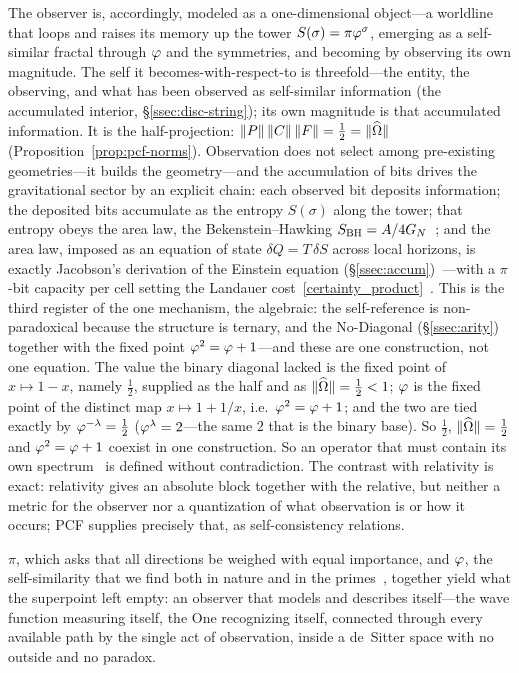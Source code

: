 The observer is, accordingly, modeled as a one-dimensional object---a worldline that loops and raises its memory up the tower $S(\sigma)=\pi\varphi^\sigma$, emerging as a self-similar fractal through $\varphi$ and the symmetries, and becoming by observing its own magnitude. The self it becomes-with-respect-to is threefold---the entity, the observing, and what has been observed as self-similar information (the accumulated interior, \S\ref{ssec:disc-string}); its own magnitude is that accumulated information. It is the half-projection: $\|P\|\,\|C\|\,\|F\|=\tfrac12=\|\widehat{\Omega}\|$ (Proposition~\ref{prop:pcf-norms}). Observation does not select among pre-existing geometries---it builds the geometry---and the accumulation of bits drives the gravitational sector by an explicit chain: each observed bit deposits information; the deposited bits accumulate as the entropy $S(\sigma)$ along the tower; that entropy obeys the area law, the Bekenstein--Hawking $S_{\mathrm{BH}}=A/4G_{N}$~\cite{Bekenstein73,Hawking75}; and the area law, imposed as an equation of state $\delta Q=T\,\delta S$ across local horizons, is exactly Jacobson's derivation of the Einstein equation (\S\ref{ssec:accum})~\cite{Jacobson1995}---with a $\pi$-bit capacity per cell setting the Landauer cost~\eqref{certainty_product}~\cite{Landauer61}. This is the third register of the one mechanism, the algebraic: the self-reference is non-paradoxical because the structure is ternary, and the No-Diagonal (\S\ref{ssec:arity}) together with the fixed point $\varphi^2=\varphi+1$---and these are one construction, not one equation. The value the binary diagonal lacked is the fixed point of $x\mapsto 1-x$, namely $\tfrac12$, supplied as the half and as $\|\widehat{\Omega}\|=\tfrac12<1$; $\varphi$ is the fixed point of the distinct map $x\mapsto 1+1/x$, i.e.\ $\varphi^2=\varphi+1$; and the two are tied exactly by $\varphi^{-\lambda}=\tfrac12$ ($\varphi^{\lambda}=2$---the same $2$ that is the binary base). So $\tfrac12$, $\|\widehat{\Omega}\|=\tfrac12$ and $\varphi^2=\varphi+1$ coexist in one construction. So an operator that must contain its own spectrum~\cite{HP} is defined without contradiction. The contrast with relativity is exact: relativity gives an absolute block together with the relative, but neither a metric for the observer nor a quantization of what observation is or how it occurs; PCF supplies precisely that, as self-consistency relations.

$\pi$, which asks that all directions be weighed with equal importance, and $\varphi$, the self-similarity that we find both in nature and in the primes~\cite{F1}, together yield what the superpoint left empty: an observer that models and describes itself---the wave function measuring itself, the One recognizing itself, connected through every available path by the single act of observation, inside a de~Sitter space with no outside and no paradox.

